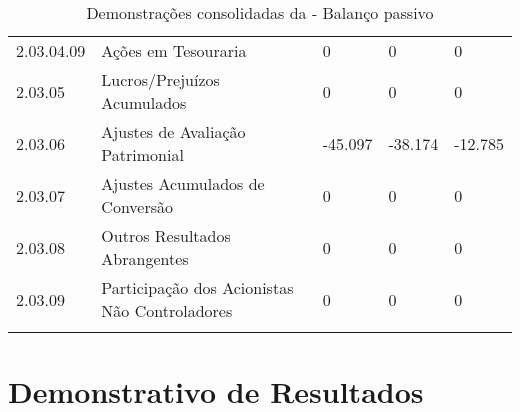 \begin{center}
\begin{longtable}{p{}|p{}|p{}|p{}|p{}}
2.03.04.09 & Ações em Tesouraria & 0 & 0 & 0\tabularnewline
2.03.05 & Lucros/Prejuízos Acumulados & 0 & 0 & 0\tabularnewline
2.03.06 & Ajustes de Avaliação Patrimonial & -45.097 & -38.174 & -12.785\tabularnewline
2.03.07 & Ajustes Acumulados de Conversão & 0 & 0 & 0\tabularnewline
2.03.08 & Outros Resultados Abrangentes & 0 & 0 & 0\tabularnewline
2.03.09 & Participação dos Acionistas Não Controladores & 0 & 0 & 0\tabularnewline
\hline
\caption{Demonstrações consolidadas da \nomeCompletoPositivo{} - Balanço passivo}
\end{longtable}
\vspace*{-40pt}
\par\end{center}

\clearpage

\section{Demonstrativo de Resultados}

